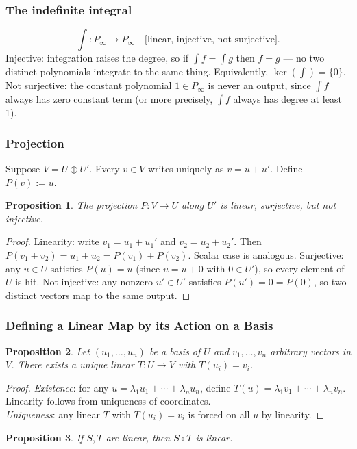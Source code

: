 \documentclass{article}
\newtheorem{proposition}{Proposition}
\begin{document}
\subsubsection*{The indefinite integral}
\[\int: P_\infty \to P_\infty \quad \text{[linear, injective, not surjective]}.\]
Injective: integration raises the degree, so if $\int f = \int g$ then $f = g$ --- no two distinct polynomials integrate to the same thing. Equivalently, $\ker(\int) = \{0\}$. Not surjective: the constant polynomial $1 \in P_\infty$ is never an output, since $\int f$ always has zero constant term (or more precisely, $\int f$ always has degree at least 1).

\subsubsection*{Projection}
Suppose $V = U\oplus U'$. Every $v\in V$ writes uniquely as $v=u+u'$. Define $P(v):=u$.
\begin{proposition}
    The projection $P: V\to U$ along $U'$ is linear, surjective, but not injective.
\end{proposition}
\begin{proof}
    Linearity: write $v_1=u_1+u_1'$ and $v_2=u_2+u_2'$. Then $P(v_1+v_2)=u_1+u_2=P(v_1)+P(v_2)$. Scalar case is analogous. Surjective: any $u\in U$ satisfies $P(u)=u$ (since $u = u + 0$ with $0\in U'$), so every element of $U$ is hit. Not injective: any nonzero $u'\in U'$ satisfies $P(u')=0=P(0)$, so two distinct vectors map to the same output.
\end{proof}

\subsubsection{Defining a Linear Map by its Action on a Basis}
\begin{proposition}
    Let $(u_1,\ldots,u_n)$ be a basis of $U$ and $v_1,\ldots,v_n$ arbitrary vectors in $V$. There exists a unique linear $T: U\to V$ with $T(u_i)=v_i$.
\end{proposition}
\begin{proof}
    \textit{Existence}: for any $u=\lambda_1u_1+\cdots+\lambda_nu_n$, define $T(u)=\lambda_1v_1+\cdots+\lambda_nv_n$. Linearity follows from uniqueness of coordinates.\\
    \textit{Uniqueness}: any linear $T$ with $T(u_i)=v_i$ is forced on all $u$ by linearity.
\end{proof}
\begin{proposition}
    If $S,T$ are linear, then $S\circ T$ is linear.
\end{proposition}
\end{document}
